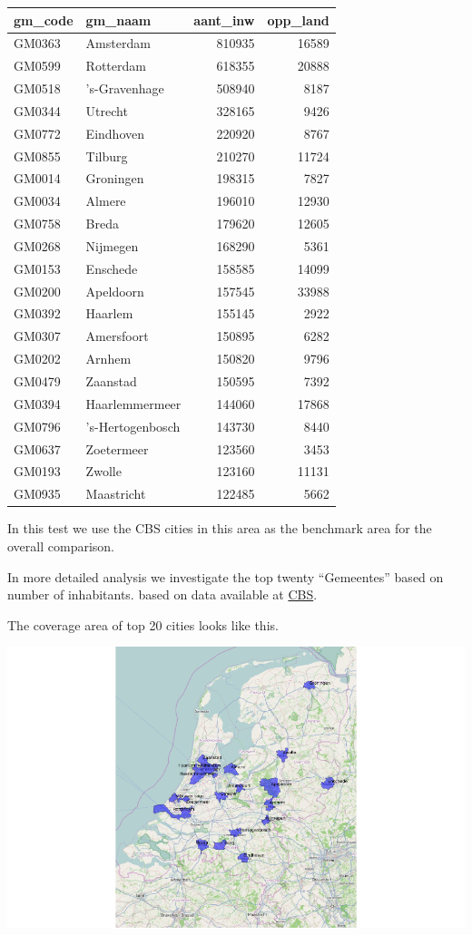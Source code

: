 \documentclass[]{article}
\begin{document}
\begin{longtable}[c]{@{}llrr@{}}
\toprule
gm\_code & gm\_naam & aant\_inw & opp\_land\tabularnewline
\midrule
\endhead
GM0363 & Amsterdam & 810935 & 16589\tabularnewline
GM0599 & Rotterdam & 618355 & 20888\tabularnewline
GM0518 & 's-Gravenhage & 508940 & 8187\tabularnewline
GM0344 & Utrecht & 328165 & 9426\tabularnewline
GM0772 & Eindhoven & 220920 & 8767\tabularnewline
GM0855 & Tilburg & 210270 & 11724\tabularnewline
GM0014 & Groningen & 198315 & 7827\tabularnewline
GM0034 & Almere & 196010 & 12930\tabularnewline
GM0758 & Breda & 179620 & 12605\tabularnewline
GM0268 & Nijmegen & 168290 & 5361\tabularnewline
GM0153 & Enschede & 158585 & 14099\tabularnewline
GM0200 & Apeldoorn & 157545 & 33988\tabularnewline
GM0392 & Haarlem & 155145 & 2922\tabularnewline
GM0307 & Amersfoort & 150895 & 6282\tabularnewline
GM0202 & Arnhem & 150820 & 9796\tabularnewline
GM0479 & Zaanstad & 150595 & 7392\tabularnewline
GM0394 & Haarlemmermeer & 144060 & 17868\tabularnewline
GM0796 & 's-Hertogenbosch & 143730 & 8440\tabularnewline
GM0637 & Zoetermeer & 123560 & 3453\tabularnewline
GM0193 & Zwolle & 123160 & 11131\tabularnewline
GM0935 & Maastricht & 122485 & 5662\tabularnewline
\bottomrule
\end{longtable}

In this test we use the CBS cities in this area as the benchmark area
for the overall comparison.

In more detailed analysis we investigate the top twenty ``Gemeentes''
based on number of inhabitants. based on data available at
\href{http://www.cbs.nl/nl-NL/menu/themas/dossiers/nederland-regionaal/publicaties/geografische-data/archief/2014/2013-wijk-en-buurtkaart-art.htm}{CBS}.

The coverage area of top 20 cities looks like this.

\includegraphics{speedtest-analysis_files/figure-latex/top-1.pdf}
\end{document}
